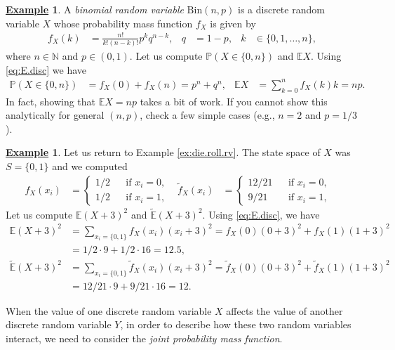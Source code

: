 \documentclass[12pt]{book}
\numberwithin{equation}{chapter}
\theoremstyle{plain}
\numberwithin{theorem}{section}
\theoremstyle{definition}
\newtheorem{example}[theorem]{\underline{Example}}
\numberwithin{exercise}{chapter}
\newcommand{\<}{\langle}
\renewcommand{\>}{\rangle}
\renewcommand{\(}{\left(}
\renewcommand{\)}{\right)}
\renewcommand{\[}{\left[}
\renewcommand{\]}{\right]}
\newcommand\Eb{\mathds{E}}
\newcommand\Pb{\mathds{P}}
\newcommand\Nb{\mathds{N}}
\newcommand\Ebt{\widetilde{\Eb}}
\newcommand\ft{\widetilde{f}}
\theoremstyle{definition}
\numberwithin{question}{section}
\begin{document}
\begin{example}
A \textit{binomial random variable} $\text{Bin}(n,p)$ is a discrete random variable $X$ whose probability mass function $f_X$ is given by
\begin{align}
f_X(k)
	&=	\frac{n!}{k!(n-k)!} p^k q^{n-k} , &
q
	&=	1-p , &
k
	&\in \{ 0, 1, \ldots, n \} , 
\end{align}
where $n \in \Nb$ and $p \in (0,1)$.  Let us compute $\Pb(X \in \{0,n\})$ and $\Eb X$.  Using \eqref{eq:E.disc} we have
\begin{align}
\Pb(X \in \{0,n\} )
	&=	f_X(0) + f_X(n) 
	=		p^n + q^n , &
\Eb X
	&=	\sum_{k=0}^n f_X(k) k
	=		n p .
\end{align}
In fact, showing that $\Eb X = n p$ takes a bit of work.  If you cannot show this analytically for general $(n,p)$, check a few simple cases (e.g., $n=2$ and $p = 1/3$).
\end{example}

\begin{example}
Let us return to Example \ref{ex:die.roll.rv}.  The state space of $X$ was $S = \{ 0 ,1 \}$ and we computed
\begin{align}
f_X(x_i)
	&=	\left \{ \begin{aligned}
			1/2 && \text{if $x_i = 0$}, \\
			1/2 && \text{if $x_i = 1$},
			\end{aligned} \right. &
\ft_X(x_i)
	&=	\left \{ \begin{aligned}
			12/21 && \text{if $x_i = 0$}, \\
			9/21 && \text{if $x_i = 1$},
			\end{aligned} \right. &
\end{align}
Let us compute $\Eb (X+3)^2$ and $\Ebt (X+3)^2$.  Using \eqref{eq:E.disc}, we have
\begin{align}
\Eb (X+3)^2
	&=	\sum_{x_i=\{0,1\}} f_X(x_i) (x_i+3)^2
	=		f_X(0) (0+3)^2 + f_X(1) (1+3)^2 \\
	&=		1/2 \cdot 9 + 1/2 \cdot 16
	=		12.5 , \\
\Ebt (X+3)^2
	&=	\sum_{x_i=\{0,1\}} \ft_X(x_i) (x_i+3)^2
	=		\ft_X(0) (0+3)^2 + \ft_X(1) (1+3)^2 \\
	&=		12/21 \cdot 9 + 9/21 \cdot 16
	=		12.
\end{align}
\end{example}

\noindent
When the value of one discrete random variable $X$ affects the value of another discrete random variable $Y$, in order to describe how these two random variables interact, we need to consider the \textit{joint probability mass function}.
\end{document}
